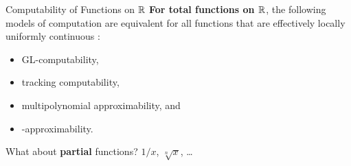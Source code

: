 \begin{frame}{Computability of Functions on $\mathbb{R}$}
\vspace{-1em}
    \pause
    \textbf{For total functions on $\mathbb{R}$}\pause, the following models of computation are equivalent \pause for all functions that are effectively locally uniformly continuous \citep{ComputableTotalFunctionsOnMetricAlgebras_JohnTuckerAndJeffZucker}:
    \begin{itemize}
        \item GL-computability,
        \item tracking computability,
        \item multipolynomial
        approximability, and
        \item \WhileCC-approximability.
    \end{itemize}
    \pause What about \textbf{\textcolor{Sepia}{partial}} functions? $1/x$, $\sqrt[n]{x}$, \ldots
    \pause
    

\end{frame}
